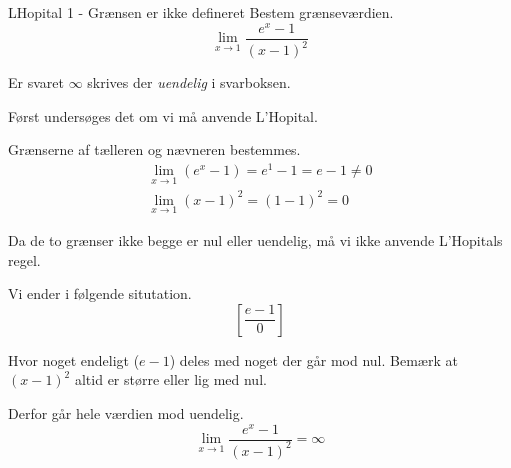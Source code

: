 \documentclass{article}
\begin{document}
\tableofcontents
\newpage

\begin{exercise}{LHopital 1 - Grænsen er ikke defineret}
Bestem grænseværdien.
\[
\lim_{x \to 1} \frac{e^x - 1}{(x - 1)^2}
\]

Er svaret $\infty$ skrives der \emph{uendelig} i svarboksen.


\hint
Først undersøges det om vi må anvende L'Hopital.

\hint
Grænserne af tælleren og nævneren bestemmes.
\begin{align*}
\lim_{x \to 1} (e^x - 1) = e^1 - 1 = e - 1 \neq 0 \\
\lim_{x \to 1} (x - 1)^2 = (1 - 1)^2 = 0
\end{align*}

\hint
Da de to grænser ikke begge er nul eller uendelig, må vi ikke anvende L'Hopitals regel. 

\hint
Vi ender i følgende situtation.
\[
\left[ \frac{e - 1}{0} \right]
\]

\hint
Hvor noget endeligt ($e - 1$) deles med noget der går mod nul.
Bemærk at $(x - 1)^2$ altid er større eller lig med nul. 

Derfor går hele værdien mod uendelig.
\[
\lim_{x \to 1} \frac{e^x - 1}{(x - 1)^2} = \infty
\]

\end{exercise}
\end{document}
